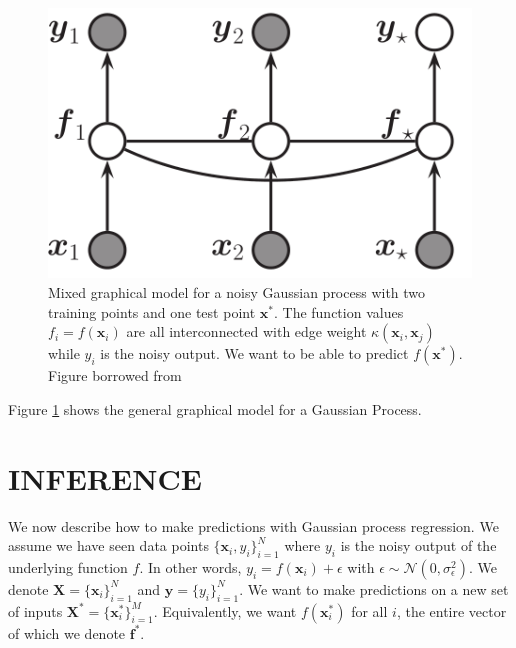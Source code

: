 \documentclass[letterpaper, 11 pt, conference]{ieeeconf}  %
\newcommand{\by}{\textbf{y}}
\newcommand{\bx}{\textbf{x}}
\newcommand{\bX}{\textbf{X}}
\begin{document}
   \begin{figure}[thpb]
      \centering
      \includegraphics[scale=1.0]{graphical_model.PNG}
      \caption{Mixed graphical model for a noisy Gaussian process with two training points and one test point $\bx^*$. The function values $f_i = f(\bx_i)$ are all interconnected with edge weight $\kappa(\bx_i, \bx_j)$ while $y_i$ is the noisy output. We want to be able to predict $f(\bx^*)$. Figure borrowed from \cite{c2}}
      \label{gm}
   \end{figure}
Figure \ref{gm} shows the general graphical model for a Gaussian Process.

\section{INFERENCE}

We now describe how to make predictions with Gaussian process regression. We assume we have seen data points $\{\bx_i, y_i\}_{i=1}^N$ where $y_i$ is the noisy output of the underlying function $f$. In other words, $y_i = f(\bx_i) + \epsilon$ with $\epsilon \sim \mathcal{N}(0, \sigma_\epsilon^2)$. We denote $\bX = \{\bx_i\}_{i=1}^N$ and $\by = \{y_i\}_{i=1}^N$. We want to make predictions on a new set of inputs $\bX^* = \{\textbf{x}^*_i\}_{i=1}^M$. Equivalently, we want $f(\textbf{x}^*_i)$ for all $i$, the entire vector of which we denote $\textbf{f}^*$. 
\end{document}
